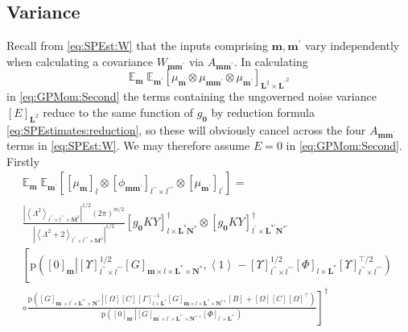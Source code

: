 \documentclass[preprint,12pt]{elsarticle}
\newcommand*{\M}[1]{\ensuremath{#1}\xspace}
\newcommand*{\x}{\times}
\newcommand*{\mi}[1]{\mathbf{#1}}
\newcommand*{\te}[2][]{\left\lbrack{#2}\right\rbrack_{#1}}
\newcommand*{\diag}[2][]{\left\langle{#2}\right\rangle_{#1}}
\newcommand*{\prob}[3]{\M{\mathrm{p}\!\left(\left.{#1}\right\vert{#2,#3}\right)}}
\newcommand*{\evt}[3][]{\mathbb{E}_{#3}^{#1}\!#2}
\newcommand*{\modulus}[1]{\M{\left\lvert{#1}\right\rvert}}
\begin{document}
    \subsection{Variance}\label{sub:GPEst:Variance}
        Recall from \cref{eq:SPEst:W} that the inputs comprising $\mi{m},\mi{m^{\prime}}$ vary independently when calculating a covariance $W_{\mi{m m^{\prime}}}$ via $A_{\mi{m m^{\prime}}}$. In calculating
        \begin{equation*}
            \evt{\;\evt{\te[\mi{L}^{2} \x \mi{L^{\prime}}^{2}]{\mu_{\mi{m}} \otimes \mu_{\mi{mm^{\prime}}} \otimes \mu_{\mi{m^{\prime}}}}}{\mi{m^{\prime}}}}{\mi{m}}
        \end{equation*}
        in \cref{eq:GPMom:Second} the terms containing the ungoverned noise variance $\te[\mi{L}^2]{E}$ reduce to the same function of $g_{\mi{0}}$ by reduction formula \cref{eq:SPEstimates:reduction}, so these will obviously cancel across the four $A_{\mi{m m^{\prime}}}$ terms in \cref{eq:SPEst:W}. 
        We may therefore assume $E=0$ in \cref{eq:GPMom:Second}. Firstly
        \begin{multline*}
            \evt{\;\evt{\te[]{\te[l]{\mu_{\mi{m}}} \otimes \te[l^{\prime\prime}\x l^{\prime\prime\prime}]{\phi_{\mi{mm^{\prime}}}} \otimes \te[l^{\prime}]{\mu_{\mi{m^{\prime}}}}}}{\mi{m^{\prime}}}}{\mi{m}} = \\
            \frac
            {\modulus{\diag[l^{\prime\prime}\x l^{\prime\prime\prime}\x\mi{M}^{2}]{\Lambda^{2}}}^{1/2}(2\pi)^{m/2}}
            {\modulus{\diag[l^{\prime\prime}\x l^{\prime\prime\prime}\x\mi{M}^2]{\Lambda^{2}+2}}^{1/2}}
            \te[l\x\mi{L^{*}N^{*}}]{g_{\mi{0}}KY}^{\dagger} \otimes
            \te[l^{\prime}\x\mi{L^{*\prime}N^{*\prime}}]{g_{\mi{0}}KY}^{\dagger} \\
            \left\lbrack
            \prob{\te[\mi{m}]{0}}{\te[l^{\prime\prime}\x l^{\prime\prime\prime}]{\Upsilon}^{1/2} \te[\mi{m}\x l\x \mi{L^{*}\x N^{*}}]{G}} 
            {\diag[]{1} -
            \te[l^{\prime\prime}\x l^{\prime\prime\prime}]{\Upsilon}^{1/2} \te[l\x \mi{L^{*}}]{\Phi}\te[l^{\prime\prime}\x l^{\prime\prime\prime}]{\Upsilon}^{\intercal/2}} \phantom{\frac{_{\vert}^{\vert}}{_{\vert}^{\vert}}} \right.\\
            \left. \circ 
                \frac{
                    \prob{\te[\mi{m^{\prime}}\x l^{\prime}\x \mi{L^{*\prime}\x N^{*\prime}}]{G}}
                    {\te[]{\Omega} \te[]{C} \te[l\x \mi{L^{*}}]{\Gamma}^{-1} \te[\mi{m}\x l\x \mi{L^{*}\x N^{*}}]{G}}{\te[]{B}+\te[]{\Omega} \te[]{C} \te[]{\Omega}^{\intercal}}}
                    {\prob{\te[\mi{m^{\prime}}]{0}}{\te[\mi{m^{\prime}}\x l^{\prime}\x \mi{L^{*\prime}\x N^{*\prime}}]{G}}{\te[l^{\prime}\x \mi{L^{*\prime}}]{\Phi}}}
            \right\rbrack^{\dagger}
        \end{multline*}
\end{document}
